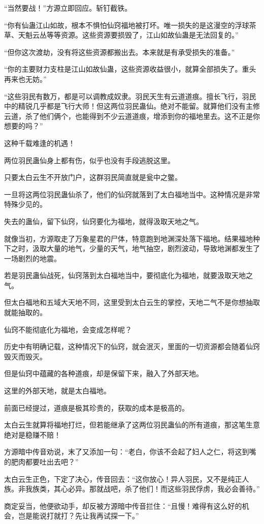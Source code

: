 \begin{this_body}
“当然要战！”方源立即回应。斩钉截铁。

“你有仙蛊江山如故，根本不惧怕仙窍福地被打坏。唯一损失的是这漫空的浮球茶草、天魁云丛等等资源。这些资源要损毁了，江山如故仙蛊是无法回复的。”

“但你这次渡劫，没有将这些资源都搬出去。本来就是有承受损失的准备。”

“你的主要财力支柱是江山如故仙蛊，这些资源收益很小，就算全部损失了。重头再来也无妨。”

“这些羽民有数万，都是可以调教成奴隶。羽民天生有云道道痕。擅长飞行，羽民中的精锐几乎都是飞行大师！但这两位羽民蛊仙。绝对不能留。就算他们没有主修云道，杀了他们俩个，也能得到不少云道道痕，增添到你的福地里去。这不正是你想要的吗？”

这种千载难逢的机遇！

两位羽民蛊仙身上都有伤，似乎也没有手段逃脱这里。

只要太白云生不开放门户，这群羽民简直就是瓮中之鳖。

一旦将这两位羽民蛊仙杀了，他们的仙窍就落到了太白福地当中。这种情况是非常特殊少见的。

失去的蛊仙，留下仙窍，仙窍要化为福地，就得汲取天地之气。

就像当初，方源取走了万象星君的尸体，特意跑到地渊深处落下福地。结果福地种下之时，汲取大量的地气，少量的天气，地气抽空，剧烈波动，导致地渊都发生了一场剧烈的地震。

若是羽民蛊仙战死，仙窍落到太白福地当中，要彻底化为福地，就要汲取天地之气。

但太白福地和五域大天地不同，这里受到太白云生的掌控，天地二气不是你想抽取就能抽取的。

仙窍不能彻底化为福地，会变成怎样呢？

历史中有明确记载，这种情况下的仙窍，就会泯灭，里面的一切资源都会随着仙窍毁灭而毁灭。

但是仙窍中蕴藏的各种道痕，却是保留下来，融入了外部天地。

这里的外部天地，就是太白福地。

前面已经提过，道痕是极其珍贵的，获取的成本是极高的。

太白云生就算将福地打烂，但若能继承了这两位羽民蛊仙的所有道痕，那这笔生意绝对是稳赚不赔！

方源暗中传音劝说，末了又添加一句：“老白，你该不会起了妇人之仁，将这到嘴的肥肉都要吐出去吧？”

太白云生正色，下定了决心，传音回去：“这你放心！异人羽民，又不是纯正人族。非我族类，其心必异。那就战吧，杀了他们！而这些羽民俘虏，我必会善待。”

商定妥当，他便欲动手，却反被方源暗中传音拦住：“且慢！难得有这么好的机会，岂是能说打就打？先让我再试探一下。”


\end{this_body}
